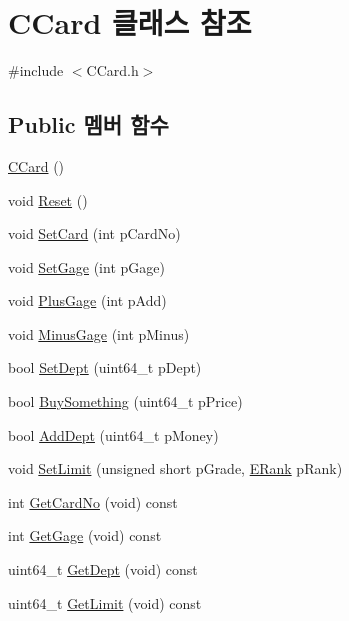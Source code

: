 \hypertarget{class_c_card}{\section{\-C\-Card 클래스 참조}
\label{class_c_card}
}


{\ttfamily \#include $<$\-C\-Card.\-h$>$}

\subsection*{\-Public 멤버 함수}
\begin{DoxyCompactItemize}
\item 
\hyperlink{class_c_card_aa4dcdbe0d0ec085e0b389af7324e9486}{\-C\-Card} ()
\item 
void \hyperlink{class_c_card_a9a38050657972e24f78946c3cd00f8ea}{\-Reset} ()
\item 
void \hyperlink{class_c_card_abca7c4b70ec5c5bc576cd8aae4249c8e}{\-Set\-Card} (int p\-Card\-No)
\item 
void \hyperlink{class_c_card_a7f3e715065d6a12c783800be7d6a2c37}{\-Set\-Gage} (int p\-Gage)
\item 
void \hyperlink{class_c_card_aa8c7fc4dc97f1c75b1f5fba01184faf4}{\-Plus\-Gage} (int p\-Add)
\item 
void \hyperlink{class_c_card_ad1856729f625e4471cf9a53b532d4ccc}{\-Minus\-Gage} (int p\-Minus)
\item 
bool \hyperlink{class_c_card_a7d70a6c3bd33c10d91798406bdea9a6b}{\-Set\-Dept} (uint64\-\_\-t p\-Dept)
\item 
bool \hyperlink{class_c_card_a2610e5a55aefb4218c619c1d4d349883}{\-Buy\-Something} (uint64\-\_\-t p\-Price)
\item 
bool \hyperlink{class_c_card_a2fbb6cdc260f3835e4551c50e66daae4}{\-Add\-Dept} (uint64\-\_\-t p\-Money)
\item 
void \hyperlink{class_c_card_adb058ac448af3e5a4e7f15cf9c7037df}{\-Set\-Limit} (unsigned short p\-Grade, \hyperlink{_constants_8h_a4db5fb2e90acc4ef6c281d6cca4dea4e}{\-E\-Rank} p\-Rank)
\item 
int \hyperlink{class_c_card_ad129e69c37d03413300a6b6870625656}{\-Get\-Card\-No} (void) const 
\item 
int \hyperlink{class_c_card_ab9e6eca765f088ba12692c5a59720320}{\-Get\-Gage} (void) const 
\item 
uint64\-\_\-t \hyperlink{class_c_card_a7db6358703921c625c1d2a79418dfb9c}{\-Get\-Dept} (void) const 
\item 
uint64\-\_\-t \hyperlink{class_c_card_aecf5a0ace3aa06dcc043dd17c0884d34}{\-Get\-Limit} (void) const 
\end{DoxyCompactItemize}


